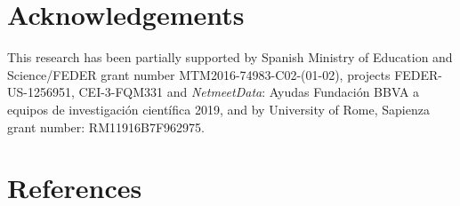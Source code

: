 \documentclass[10pt,a4paper]{elsarticle}
\begin{document}






% 

% 
\section*{Acknowledgements}
\noindent
This research has been partially supported by Spanish Ministry of Education and Science/FEDER grant number  MTM2016-74983-C02-(01-02), projects FEDER-US-1256951, CEI-3-FQM331 and  \textit{NetmeetData}: Ayudas Fundaci\'on BBVA a equipos de investigaci\'on cient\'ifica 2019, and by University of Rome, Sapienza grant number: RM11916B7F962975.

% 


\section*{References}

\end{document}
